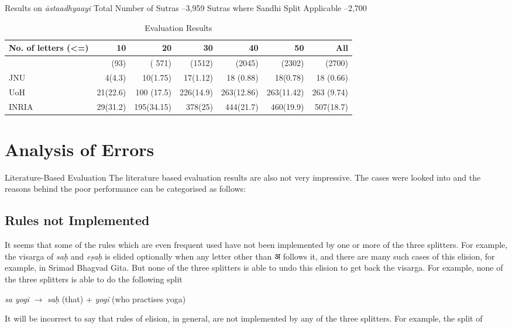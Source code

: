 \documentclass[11pt]{article}
\begin{document}
Results on \textit{āstaadhyaayi}
Total Number of Sutras –3,959
Sutras where Sandhi Split Applicable –2,700
    


\begin{table}[h]
\begin{center}
\begin{tabular}{ l  r r r r r r  }
\hline  \bf No. of letters (<=) & \bf 10 & \bf  20 & \bf 30 & \bf 40 & \bf 50 & \bf  All \\
\hline
 &(93)&( 571) & (1512) & (2045) & (2302) & (2700)\\
JNU & 4(4.3) & 10(1.75) & 17(1.12) & 18 (0.88) & 18(0.78) & 18 (0.66)\\
UoH  & 21(22.6) & 100 (17.5) & 226(14.9) & 263(12.86) & 263(11.42) & 263 (9.74)\\
INRIA & 29(31.2) & 195(34.15) &  378(25) & 444(21.7) & 460(19.9) & 507(18.7)\\
\hline
\end{tabular}
\end{center}
\caption{\label{font-table} Evaluation Results }
\end{table}

\section{Analysis of Errors}
 Literature-Based Evaluation
The literature based evaluation results are also not very impressive. The cases were looked into and the reasons behind the poor performance can be categorised as follows:


\subsection{Rules not Implemented}
      It seems that some of the rules which are even frequent used have not been implemented by one or more of the three splitters. For example, the visarga of \textit{saḥ} and \textit{eṣaḥ} is elided optionally when any letter other than अ follows it, and there are many such cases of this elision, for example, in Srimad Bhagvad Gita. But none of the three splitters is able to undo this elision to get back the visarga. For example, none of the three splitters is able to do the following split
      
                        \textit{sa yogī} $\rightarrow$ \textit{saḥ} (that) + \textit{yogī} (who practises yoga)
                        
It will be incorrect to say that rules of elision, in general, are not implemented by any of the three splitters. For example, the split of
 
\end{document}
